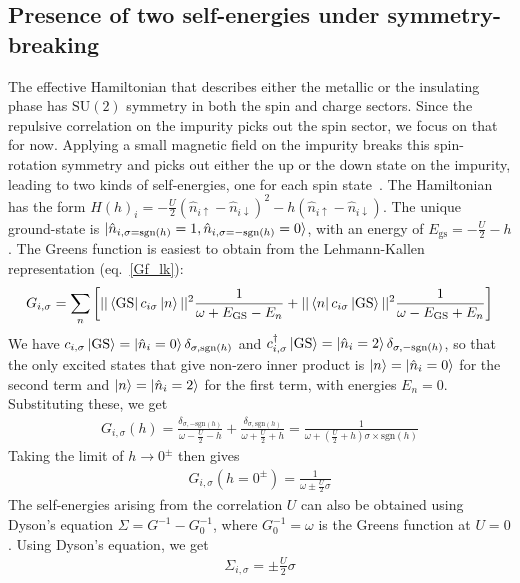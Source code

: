 \documentclass[reprint,hidelinks]{revtex4-2}
\begin{document}
\begin{widetext}
\section{Presence of two self-energies under symmetry-breaking}
The effective Hamiltonian that describes either the metallic or the insulating phase has $\mathrm{SU}(2)$ symmetry in both the spin and charge sectors. Since the repulsive correlation on the impurity picks out the spin sector, we focus on that for now. Applying a small magnetic field on the impurity breaks this spin-rotation symmetry and picks out either the up or the down state on the impurity, leading to two kinds of self-energies, one for each spin state~\cite{logan_2014,Logan_2015}. The Hamiltonian has the form \(H(h)_i = -\frac{U}{2}\left(\hat n_{i \uparrow} - \hat n_{i \downarrow}\right)^2 - h\left(\hat n_{i \uparrow} - \hat n_{i \downarrow}\right)\). The unique ground-state is \(\ket{\hat n_{i,\sigma = \text{sgn}(h)}=1,\hat n_{i,\sigma = -\text{sgn}(h)}=0}\), with an energy of \(E_\text{gs} = -\frac{U}{2} - h\). The Greens function is easiest to obtain from the Lehmann-Kallen representation (eq.~\ref{Gf_lk}):
\begin{equation}\begin{aligned}
	G_{i,\sigma} = \sum_{n}\left[||\bra{\text{GS}}c_{i\sigma}\ket{n}||^2\frac{1}{\omega + E_\text{GS} - E_n} + ||\bra{n}c_{i\sigma}\ket{\text{GS}}||^2\frac{1}{\omega - E_\text{GS} + E_n}\right]\\
\end{aligned}\end{equation}
We have \(c_{i,\sigma}\ket{\text{GS}} = \ket{\hat n_i = 0}\delta_{\sigma,\text{sgn}(h)}\) and \(c^\dagger_{i,\sigma}\ket{\text{GS}} = \ket{\hat n_i = 2}\delta_{\sigma,-\text{sgn}(h)}\), so that the only excited states that give non-zero inner product is \(\ket{n}=\ket{\hat n_i = 0}\) for the second term and \(\ket{n}=\ket{\hat n_i=2}\) for the first term, with energies \(E_n=0\). Substituting these, we get
\begin{equation}\begin{aligned}
	G_{i,\sigma}(h) = \frac{\delta_{\sigma,-\text{sgn}(h)}}{\omega - \frac{U}{2} - h} + \frac{\delta_{\sigma,\text{sgn}(h)}}{\omega + \frac{U}{2} + h} = \frac{1}{\omega + \left(\frac{U}{2}+h\right)\sigma \times \text{sgn}(h) }
\end{aligned}\end{equation}
Taking the limit of \(h \to 0^\pm\) then gives
\begin{equation}\begin{aligned}
	G_{i,\sigma}(h=0^\pm) = \frac{1}{\omega \pm \frac{U}{2}\sigma}
\end{aligned}\end{equation}
The self-energies arising from the correlation \(U\) can also be obtained using Dyson's equation \(\Sigma = G^{-1} - G_0^{-1}\), where \(G_0^{-1} = \omega\) is the Greens function at \(U=0\). Using Dyson's equation, we get
\begin{equation}\begin{aligned}
	\Sigma_{i,\sigma} = \pm\frac{U}{2}\sigma
\end{aligned}\end{equation}


\end{widetext}
\end{document}
